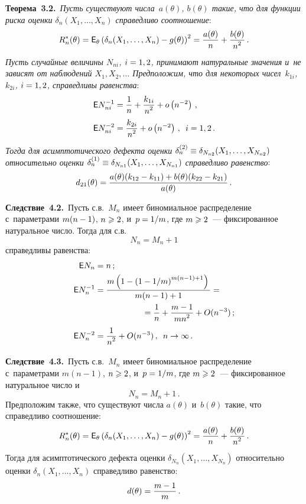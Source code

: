 \begin{multicols}{2}
\noindent
\textbf{Теорема~3.2.}\ \textit{Пусть существуют числа~$a(\theta)$, 
$b(\theta)$ такие, что для функции риска оценки $\delta_{n}(X_1,\ldots,X_{n})$ 
справедливо соотношение}:
$$ %
R^*_n(\theta)= {\sf E}_\theta\left(\delta_{n}(X_1,\ldots,X_{n}) - g(\theta)\right)^2 
= \fr{a(\theta)}{n} + \fr{b(\theta)}{n^2}\,.
$$ %
\textit{Пусть случайные величины $N_{ni}$, $i\hm = 1, 2$, 
принимают натуральные значения и~не зависят от наблюдений $X_1, X_2,\ldots$ 
Предположим, что для некоторых чисел~$k_{1i}$, $k_{2i}$, $i\hm = 1,2$, 
справедливы равенства}:
\begin{align*}
{\sf E} N_{ni}^{-1} &= \displaystyle\frac{\displaystyle 1\mathstrut}{\displaystyle n\mathstrut} + \displaystyle\frac{\displaystyle k_{1i}\mathstrut}{\displaystyle n^2\mathstrut} + o\left(n^{-2}\right)\,,
\\
{\sf E} N_{ni}^{-2} &= \displaystyle\frac{\displaystyle k_{2i}\mathstrut}{\displaystyle n^2\mathstrut} + o \left(n^{-2}\right)\,,\enskip  i = 1,2\,.
\end{align*}
\textit{Тогда для асимптотического дефекта оценки $\delta_{n}^{(2)}\hm \equiv 
\delta_{N_{n2}}(X_1,\ldots,X_{N_{n2}})$ относительно оценки $\delta_{n}^{(1)}\hm 
\equiv \delta_{N_{n1}}(X_1,\ldots,X_{N_{n1}})$ справедливо равенство}:
$$
d_{21}(\theta) = \displaystyle\frac{\displaystyle a(\theta)(k_{12} - k_{11}) + b(\theta) (k_{22} - 
k_{21})\mathstrut}{\displaystyle a(\theta)\mathstrut}\,.
$$

\noindent
\textbf{Следствие~4.2.}\ 
Пусть с.в.~$M_n$ имеет биномиальное распределение 
с~параметрами $m(n\hm-1)$, $n\hm \geqslant 2$, и~$p \hm= 1/m$, 
где $m\hm \geqslant 2$~--- фиксированное натуральное число. Тогда для 
с.в.
$$
N_n = M_n + 1
$$
справедливы равенства:
\begin{align*}
{\sf E} N_n &= n\,;
\\
{\sf E} N_n^{-1} &= \fr{m\left(1 - \left(1 - {1}/{m}\right)^{m(n-1)+1}\right)}
{m(n - 1) + 1} = {}\\
&\hspace*{20mm}{}=\fr{1}{n}+
\fr{m - 1}{mn^2} + O(n^{-3})\,;
\\
{\sf E} N_n^{-2} &= \fr{1}{n^2} + O (n^{-3})\,,\enskip n \to \infty\,.
\end{align*}


\noindent
\textbf{Следствие~4.3.}\ Пусть с.в.~$M_n$ имеет 
биномиальное распределение с~параметрами $m(n-1)$, $n \hm\geqslant 2$, 
и~$p \hm= 1/m$, где $m\hm \geqslant 2$~--- фиксированное натуральное число и~$$
N_n = M_n + 1\,.
$$
Предположим также, что существуют числа $a(\theta)$ и~$b(\theta)$ такие, 
что справедливо соотношение:
$$ %
R^*_n(\theta) = {\sf E}_\theta\left(\delta_{n}(X_1,\ldots,X_{n}) - g(\theta)\right)^2 
= \fr{a(\theta)}{n} + \fr{b(\theta)}{n^2}\,.
$$ %
Тогда для асимптотического дефекта оценки $\delta_{N_n}(X_1,\ldots,X_{N_n})$
 относительно оценки $\delta_n(X_1,\ldots,X_n)$ справедливо равенство:
$$
d(\theta) = \displaystyle\frac{\displaystyle m - 1\mathstrut}{\displaystyle m\mathstrut}\,.
$$



\end{multicols}
